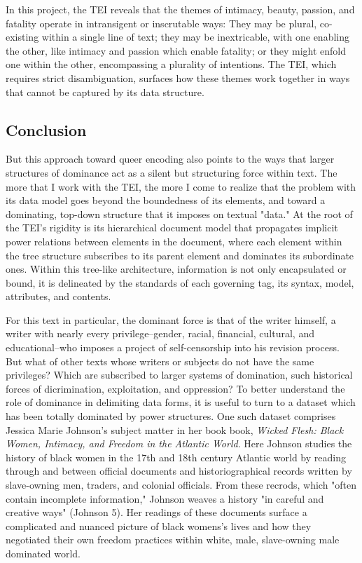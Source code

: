 \documentclass[11pt]{article}
\begin{document}
In this project, the TEI reveals that the themes of intimacy, beauty,
passion, and fatality operate in intransigent or inscrutable ways:
They may be plural, co-existing within a single line of text; they may
be inextricable, with one enabling the other, like intimacy and
passion which enable fatality; or they might enfold one within the
other, encompassing a plurality of intentions. The TEI, which requires
strict disambiguation, surfaces how these themes work together in ways
that cannot be captured by its data structure.

\subsection{Conclusion}
\label{sec:orgef5604b}
But this approach toward queer encoding also points to the
ways that larger structures of dominance act as a silent but
structuring force within text. The more that I work with the TEI, the
more I come to realize that the problem with its data model goes
beyond the boundedness of its elements, and toward a dominating,
top-down structure that it imposes on textual "data." At the root of
the TEI's rigidity is its hierarchical document model that propagates
implicit power relations between elements in the document, where each
element within the tree structure subscribes to its parent element and
dominates its subordinate ones. Within this tree-like architecture,
information is not only encapsulated or bound, it is delineated by the
standards of each governing tag, its syntax, model, attributes, and
contents. 

For this text in particular, the dominant force is that of the writer
himself, a writer with nearly every privilege--gender, racial,
financial, cultural, and educational--who imposes a project of
self-censorship into his revision process. But what of other texts
whose writers or subjects do not have the same privileges? Which are
subscribed to larger systems of domination, such historical forces of
dicrimination, exploitation, and oppression? To better understand the
role of dominance in delimiting data forms, it is useful to turn to a
dataset which has been totally dominated by power structures. One such
dataset comprises Jessica Marie Johnson's subject matter in her book
book, \emph{Wicked Flesh: Black Women, Intimacy, and Freedom in the
Atlantic World}. Here Johnson studies the history of black women in
the 17th and 18th century Atlantic world by reading through and
between official documents and historiographical records written by
slave-owning men, traders, and colonial officials. From these recrods,
which "often contain incomplete information," Johnson weaves a history
"in careful and creative ways" (Johnson 5). Her readings of these
documents surface a complicated and nuanced picture of black womens's
lives and how they negotiated their own freedom practices within
white, male, slave-owning male dominated world.
\end{document}
